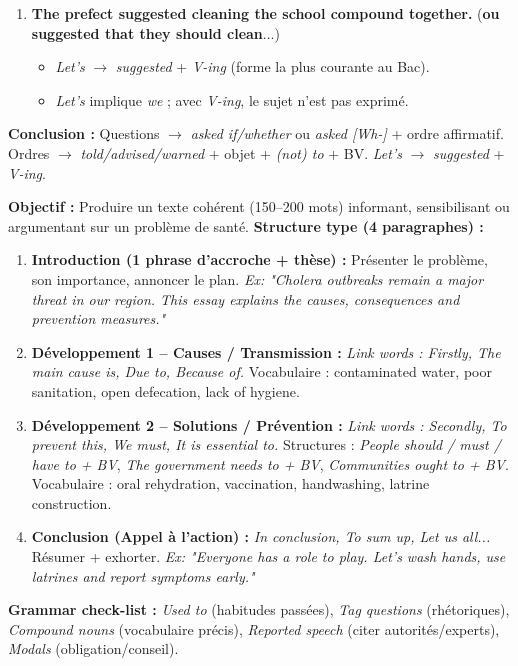 \documentclass[11pt]{article}
\newcommand{\cle}[1]{{\popxbold\color{popdark}#1}}
\begin{document}
\begin{exoresolu}
\begin{enumerate}
    \item \textbf{The prefect suggested cleaning the school compound together.} \quad(\textbf{ou} \textbf{suggested that they should clean}...)
    \begin{itemize}
        \item \emph{Let's} $\rightarrow$ \emph{suggested} + \emph{V-ing} (forme la plus courante au Bac).
        \item \emph{Let's} implique \emph{we} ; avec \emph{V-ing}, le sujet n'est pas exprimé.
    \end{itemize}
\end{enumerate}
\textbf{Conclusion :} Questions $\rightarrow$ \emph{asked if/whether} ou \emph{asked [Wh-]} + ordre affirmatif. Ordres $\rightarrow$ \emph{told/advised/warned} + objet + \emph{(not) to} + BV. \emph{Let's} $\rightarrow$ \emph{suggested} + \emph{V-ing}.
\end{exoresolu}

\begin{methode}
\textbf{Objectif :} Produire un texte cohérent (150--200 mots) informant, sensibilisant ou argumentant sur un problème de santé.
\medskip
\textbf{Structure type (4 paragraphes) :}
\begin{enumerate}
    \item \textbf{Introduction (1 phrase d'accroche + thèse) :} Présenter le problème, son importance, annoncer le plan. \textit{Ex: "Cholera outbreaks remain a major threat in our region. This essay explains the causes, consequences and prevention measures."}
    \item \textbf{Développement 1 -- Causes / Transmission :} \emph{Link words : Firstly, The main cause is, Due to, Because of.} Vocabulaire : \cle{contaminated water}, \cle{poor sanitation}, \cle{open defecation}, \cle{lack of hygiene}.
    \item \textbf{Développement 2 -- Solutions / Prévention :} \emph{Link words : Secondly, To prevent this, We must, It is essential to.} Structures : \emph{People should / must / have to + BV}, \emph{The government needs to + BV}, \emph{Communities ought to + BV}. Vocabulaire : \cle{oral rehydration}, \cle{vaccination}, \cle{handwashing}, \cle{latrine construction}.
    \item \textbf{Conclusion (Appel à l'action) :} \emph{In conclusion, To sum up, Let us all...} Résumer + exhorter. \textit{Ex: "Everyone has a role to play. Let's wash hands, use latrines and report symptoms early."}
\end{enumerate}
\textbf{Grammar check-list :} \emph{Used to} (habitudes passées), \emph{Tag questions} (rhétoriques), \emph{Compound nouns} (vocabulaire précis), \emph{Reported speech} (citer autorités/experts), \emph{Modals} (obligation/conseil).
\end{methode}
\end{document}
